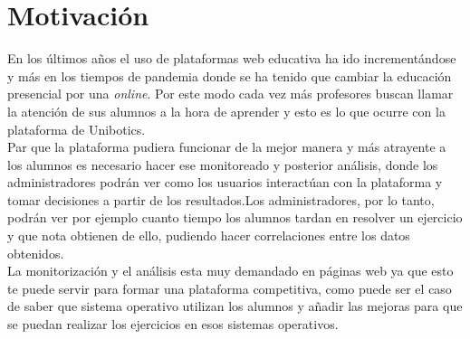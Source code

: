 \section{Motivación}

En los últimos años el uso de plataformas web educativa ha ido incrementándose y más en los tiempos de pandemia donde se ha tenido que cambiar la educación presencial por una \textit{online}. Por este modo cada vez más profesores buscan llamar la atención de sus alumnos a la hora de aprender y esto es lo que ocurre con la plataforma de Unibotics.\\

Par que la plataforma pudiera funcionar de la mejor manera y más atrayente a los alumnos es necesario hacer ese monitoreado y posterior análisis, donde los administradores podrán ver como los usuarios interactúan con la plataforma y tomar decisiones a partir de los resultados.Los administradores, por lo tanto, podrán ver por ejemplo cuanto tiempo los alumnos tardan en resolver un ejercicio y que nota obtienen de ello, pudiendo hacer correlaciones entre los datos obtenidos.\\

La monitorización y el análisis esta muy demandado en páginas web ya que esto te puede servir para formar una plataforma competitiva, como puede ser el caso de saber que sistema operativo utilizan los alumnos y añadir las mejoras para que se puedan realizar los ejercicios en esos sistemas operativos.\\









